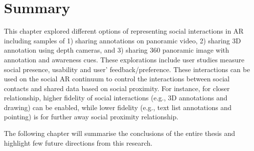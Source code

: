 \section{Summary}

This chapter explored different options of representing social interactions in AR including samples of 1) sharing annotations on panoramic video, 2) sharing 3D annotation using depth cameras, and 3) sharing 360 panoramic image with annotation and awareness cues. These explorations include user studies measure social presence, usability and user' feedback/preference. These interactions can be used on the social AR continuum to control the interactions between social contacts and shared data based on social proximity. For instance, for closer relationship, higher fidelity of social interactions (e.g., 3D annotations and drawing) can be enabled, while lower fidelity (e.g., text list annotations and pointing) is for further away social proximity relationship.

The following chapter will summarise the conclusions of the entire thesis and highlight few future directions from this research.
